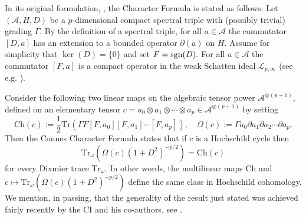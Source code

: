 \documentclass{article}
\begin{document}
In its original formulation, \cite{Connes-original-spectral-1995}, the Character Formula is stated as follows: Let $(\mathcal{A},H,D)$ be a $p$-dimensional compact spectral triple     with (possibly trivial) grading $\Gamma.$ By the definition of a spectral triple, for all $a \in \mathcal{A}$ the commutator $[D,a]$ has an extension to a bounded operator $\partial(a)$ on $H.$ Assume for simplicity that $\ker(D)=\{0\}$ and set $F={\rm sgn}(D).$ For all $a \in \mathcal{A}$ the commutator $[F,a]$ is a compact operator in the weak Schatten ideal $\mathcal{L}_{p,\infty}$ (see e.g. \cite{Connes-book, book}).

Consider the following two linear maps on the algebraic tensor power $\mathcal{A}^{\otimes(p+1)},$ defined on an elementary tensor $c = a_0\otimes a_1\otimes \cdots \otimes a_p \in \mathcal{A}^{\otimes(p+1)}$ by setting
$$\mathrm{Ch}(c) := \frac{1}{2}\mathrm{Tr}(\Gamma F[F,a_0][F,a_1]\cdots[F,a_p]),\quad \Omega(c) := \Gamma a_0\partial a_1\partial a_2\cdots \partial a_p.$$
Then the Connes Character Formula states that if $c$ is a Hochschild cycle then
\begin{equation*}
\mathrm{Tr}_\omega(\Omega(c)(1+D^2)^{-p/2}) = \mathrm{Ch}(c)
\end{equation*}
for every Dixmier trace $\mathrm{Tr}_\omega$. In other words, the multilinear maps $\mathrm{Ch}$ and $c \mapsto \mathrm{Tr}_\omega(\Omega(c)(1+D^2)^{-p/2})$ define the same class in Hochschild cohomology. We mention, in passing, that the generality of the result just stated was achieved fairly recently by the CI and his co-authors, see \cite{CRSZ}.
    
\end{document}
